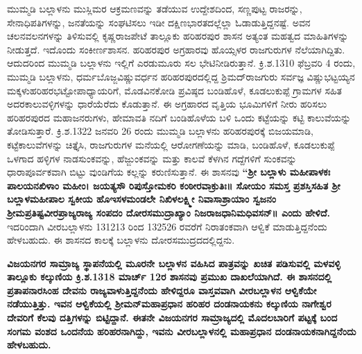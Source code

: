 ಮುಮ್ಮಡಿ ಬಲ್ಲಾಳನು ಮುಸ್ಲಿಮರ ಆಕ್ರಮಣವನ್ನು ತಡೆಯುವ ಉದ್ದೇಶದಿಂದ, ಸಣ್ಣಪುಟ್ಟ ರಾಜರನ್ನು, ಸೇನಾಧಿಪತಿ\-ಗಳನ್ನು, ಜನತೆಯನ್ನು ಸಂಘಟಿಸಲು ಇಡೀ ದಕ್ಷಿಣಭಾರತದಲ್ಲೆಲ್ಲಾ ಓಡಾಡುತ್ತಿದ್ದನಷ್ಟೆ. ಅವನ ಚಲನವಲನಗಳನ್ನು ತಿಳಿಸುವಲ್ಲಿ ಕೃಷ್ಣರಾಜಪೇಟೆ ತಾಲ್ಲೂಕು ಹರಿಹರಪುರ ಶಾಸನ ಅತ್ಯಂತ ಮಹತ್ವದ ಮಾಹಿತಿಗಳನ್ನು ನೀಡುತ್ತದೆ. ಇದೊಂದು ಸಂಕೀರ್ಣ\-ಶಾಸನ. ಹರಿಹರಪುರ ಅಗ್ರಹಾರವು ಹೊಯ್ಸಳರ ರಾಜಗುರುಗಳ ನೆಲೆಯಾಗಿದ್ದಿತು. ಆದುದರಿಂದ ಮುಮ್ಮಡಿ ಬಲ್ಲಾಳನು ಇಲ್ಲಿಗೆ ಎರಡುಮೂರು ಸಲ ಭೇಟಿನೀಡಿರುತ್ತಾನೆ. ಕ್ರಿ.ಶ.1310 ಫೆಬ್ರವರಿ 4 ರಂದು, ಮುಮ್ಮಡಿ ಬಲ್ಲಾಳನು, ಧರ್ಮಬೊಜ್ಜವಿಷ್ಣುವರ್ಧನ ಹರಿಹರಪುರದಲ್ಲಿದ್ದ ಶ್ರಿಮದ್​ರಾಜಗುರು ಸರ್ವಜ್ಞ ವಿಷ್ಣುಭಟ್ಟಯ್ಯನ ಮಕ್ಕಳು\break ಹರಿಹರಭಟ್ಟೋಪಾಧ್ಯಾಯರಿಗೆ, ಮೊಡವಿನಕೋಡಿ ಪ್ರವಿಷ್ಠದ ಬಂಡಿಹೊಳೆ, ಕೂಡಲುಕುಪ್ಪೆ ಗ್ರಾಮಗಳ ಸಹಿತ ಅದರ\break ಕಾಲುವಳ್ಳಿಗಳನ್ನು ಧಾರೆಯೆರೆದು ಕೊಡುತ್ತಾನೆ. ಈ ಅಗ್ರಹಾರದ ವೃತ್ತಿಯ ಭೂಮಿಗಳಿಗೆ ನೀರು ಹರಿಸಲು ಹರಿಹರಪುರದ ಮಹಾಜನರುಗಳು, ಹೇಮಾವತಿ ನದಿಗೆ ಬಂಡಿಹೊಳೆಯ ಬಳಿ ಒಂದು ಕಟ್ಟೆಯನ್ನು ಕಟ್ಟಿ ಕಾಲುವೆಯನ್ನು ತೋಡಿಸುತ್ತಾರೆ. ಕ್ರಿ.ಶ.1322 ಜನವರಿ 26 ರಂದು ಮುಮ್ಮಡಿ ಬಲ್ಲಾಳನು ಹರಿಹರಪುರಕ್ಕೆ ಬಿಜಯಮಾಡಿ, ಕಟ್ಟೆಕಾಲುವೆಗಳನ್ನು ಚಿತ್ತೈಸಿ, ರಾಜಗುರುಗಳ ಮನೆಯಲ್ಲಿ ಆರೋಗಣೆಯನ್ನು ಮಾಡಿ, ಬಂಡಿಹೊಳೆ, ಕೂಡಲುಕುಪ್ಪೆ ಒಳಗಾದ ಹಳ್ಳಿಗಳ ನಾಡಸುಂಕವನ್ನು, ಹೆಜ್ಜುಂಕವನ್ನು ಮತ್ತು ಕಾಲವೆ ಕೆಳಗಿನ ಗದ್ದೆಗಳಿಗೆ ಸುಂಕವನ್ನು ಧಾರಾಪೂರ್ವಕವಾಗಿ ಬಿಟ್ಟು ವುಂಡಿಗೆಯ ಕಲ್ಲನ್ನು ಕರುಣಿಸು\-ತ್ತಾನೆ. ಈ ಶಾಸನವು \textbf{“ಶ‍್ರೀ ಬಲ್ಲಾಳು ಮಹೀಪಾಳಕಃ ಪಾಲಯನಖಿಳಾಂ ಮಹೀಂ। ಜಯತ್ಯಸೌ ರಿಪುಸ್ತೋಮಕರಿ ಕಂಠೀರವಾಕ್ರುತಿಃ॥ ಸೋಯಂ ಸಮಸ್ತ ಪ್ರಶಸ್ತಿಸಹಿತ ಶ‍್ರೀ ಬಲ್ಲಾಳಮಹೀಪಾಲ ಸ್ವಕೀಯ ಹೊಇಸಳಮಂಡಲೇ ನಿಖಿಳಲಕ್ಷ್ಮೀ ನಿವಾಸಾಶ್ರಾಯಾಂ ಸ್ವಜನಂ ಶ‍್ರೀಮಪ್ರತಿಷ್ಟವೀರಪ್ರಾಜ್ಯರಾಜ್ಯ ಸಂಪದಂ ದೋರಸಮುದ್ರಾಖ್ಯಾಂ ನಿಜರಾಜಧಾನಿಮಧಿವಸನ್​॥ ಎಂದು ಹೇಳಿದೆ. } ಇದರಿಂದಾಗಿ ವೀರಬಲ್ಲಾಳನು 1312\enginline{-}13 ರಿಂದ 1325\enginline{-}26 ರವರೆಗೆ ನಿರಾತಂಕವಾಗಿ ಆಳ್ವಿಕೆ ಮಾಡುತ್ತಿದ್ದನೆಂದು ಹೇಳಬಹುದು. ಈ ಶಾಸನದ ಕಾಲಕ್ಕೆ ಬಲ್ಲಾಳನು ದೋರಸಮುದ್ರದದಲ್ಲಿದ್ದನು.

\textbf{ವಿಜಯನಗರ ಸಾಮ್ರಾಜ್ಯ ಸ್ಥಾಪನೆಯಲ್ಲಿ ಮೂರನೇ ಬಲ್ಲಾಳನ ವಹಿಸಿದ ಪಾತ್ರವನ್ನು ಖಚಿತ ಪಡಿಸುವಲ್ಲಿ ಮಳವಳ್ಳಿ ತಾಲ್ಲೂಕು ಕಲ್ಕುಣಿಯ ಕ್ರಿ.ಶ.1318 ಮಾರ್ಚ್ 12ರ ಶಾಸನವು ಪ್ರಮುಖ ದಾಖಲೆಯಾಗಿದೆ. ಈ ಶಾಸನದಲ್ಲಿ ಪ್ರತಾಪನಾರಸಿಂಹ ದೇವನು ರಾಜ್ಯವಾಳುತ್ತಿದ್ದನೆಂದು ಹೇಳಿದ್ದರೂ ವಾಸ್ತವವಾಗಿ ವೀರಬಲ್ಲಾಳನ ಆಳ್ವಿಕೆಯೇ ನಡೆಯುತ್ತಿತ್ತು. ಇವನ ಆಳ್ವಿಕೆಯಲ್ಲಿ ಶ‍್ರೀಮನ್​ಮಹಾಪ್ರಧಾನ ಹರಿಹರ ದಂಡನಾಯಕನು ಕಲ್ಕುಣಿಯ ನಾಗೇಶ್ವರ ದೇವರಿಗೆ ಕೆಲವು ದತ್ತಿಗಳನ್ನು ಬಿಟ್ಟಿದ್ದಾನೆ. ಈತನೇ ವಿಜಯನಗರ ಸಾಮ್ರಾಜ್ಯದಲ್ಲಿ ಮೊದಲಬಾರಿಗೆ ಪಟ್ಟಕ್ಕೆ ಬಂದ ಸಂಗಮ ವಂಶದ ಒಂದನೆಯ ಹರಿಹರನಾಗಿದ್ದು, ಇವನು ವೀರಬಲ್ಲಾಳನಲ್ಲಿ ಮಹಾಪ್ರಧಾನ ದಂಡನಾಯಕನಾಗಿದ್ದನೆಂದು ಹೇಳಬಹುದು.}


